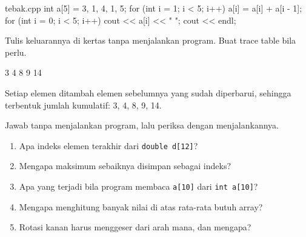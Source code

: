 \documentclass[a4paper]{article}
\begin{document}
\begin{MKode}{tebak.cpp}
int a[5] = {3, 1, 4, 1, 5};
for (int i = 1; i < 5; i++) {
    a[i] = a[i] + a[i - 1];
}
for (int i = 0; i < 5; i++) {
    cout << a[i] << " ";
}
cout << endl;
\end{MKode}
\begin{Tebak}[]
Tulis keluarannya di kertas tanpa menjalankan program. Buat trace table bila perlu.
\end{Tebak}
\begin{Jawaban}[]
\begin{MKeluaran}[]
3 4 8 9 14 
\end{MKeluaran}
Setiap elemen ditambah elemen sebelumnya yang sudah diperbarui, sehingga terbentuk jumlah kumulatif: 3, 4, 8, 9, 14.
\end{Jawaban}
\par\vspace{4pt}\par\vspace{6pt}
Jawab tanpa menjalankan program, lalu periksa dengan menjalankannya.
\begin{enumerate}
\item Apa indeks elemen terakhir dari \texttt{double d[12]}?
\item Mengapa maksimum sebaiknya disimpan sebagai indeks?
\item Apa yang terjadi bila program membaca \texttt{a[10]} dari \texttt{int a[10]}?
\item Mengapa menghitung banyak nilai di atas rata-rata butuh array?
\item Rotasi kanan harus menggeser dari arah mana, dan mengapa?
\end{enumerate}
\end{document}
